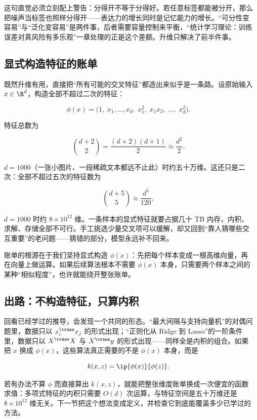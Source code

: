 这句直觉必须立刻配上警告：分得开不等于分得好。若任意标签都能被分开，那么把噪声当标签也照样分得开——表达力的增长同时是记忆能力的增长。``可分性变容易''与``泛化变容易''是两件事，后者需要容量控制来平衡，``统计学习理论：训练误差对真风险有多乐观''一章处理的正是这个差额。升维只解决了前半件事。

\subsection{显式构造特征的账单}

既然升维有用，直接把``所有可能的交叉特征''都造出来似乎是一条路。设原始输入 \(x\in\R^d\)，构造全部不超过二次的特征：

\[
\phi(x)=\bigl(1,\;x_1,\dots,x_d,\;x_1^2,\;x_1x_2,\;\dots,\;x_d^2\bigr).
\]

特征总数为

\[
\binom{d+2}{2}=\frac{(d+2)(d+1)}{2}\approx \frac{d^2}{2}.
\]

\(d=1000\)（一张小图片、一段稀疏文本都远不止此）时约五十万维。这还只是二次：全部不超过五次的特征数为

\[
\binom{d+5}{5}\approx \frac{d^5}{120},
\]

\(d=1000\) 时约 \(8\times 10^{12}\) 维。一条样本的显式特征就要占据几十 TB 内存，内积、求解、存储全部不可行。手工挑选少量交叉项可以缓解，却又回到``靠人猜哪些交互重要''的老问题——猜错的部分，模型永远补不回来。

账单的根源在于我们坚持显式构造 \(\phi(x)\)：先把每个样本变成一根高维向量，再在向量上做运算。如果后续算法根本不需要 \(\phi(x)\) 本身，只需要两个样本之间的某种``相似程度''，也许就能绕开整张账单。

\subsection{出路：不构造特征，只算内积}

回看已经学过的推导，会发现一个共同的形态。``最大间隔与支持向量机''的对偶问题里，数据只以 \(x_i^{\trans}x_j\) 的形式出现；``正则化从 Ridge 到 Lasso''的一阶条件里，数据只以 \(X^{\trans}X\) 与 \(X^{\trans}y\) 的形式出现——同样全是内积的组合。如果把 \(x\) 换成 \(\phi(x)\)，这些算法真正需要的不是 \(\phi(x)\) 本身，而是

\[
k(x,z)=\ip{\phi(x)}{\phi(z)}.
\]

若有办法不算 \(\phi\) 而直接算出 \(k(x,z)\)，就能把整张维度账单换成一次便宜的函数求值：多项式特征的内积只需要 \(O(d)\) 次运算，与特征空间是五十万维还是 \(8\times10^{12}\) 维无关。下一节把这个想法变成定义，并检查它到底能覆盖多少已学过的方法。

